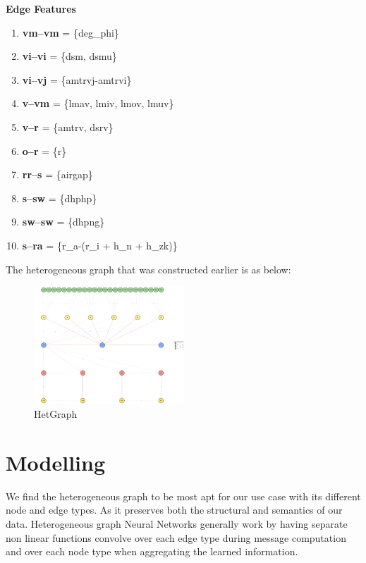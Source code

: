 \documentclass[a4paper,12pt]{article}
\begin{document}
\textbf{Edge Features}

\begin{enumerate}

    \item \textbf{vm--vm} = \{deg\_phi\}

    \item \textbf{vi--vi} = \{dsm, dsmu\}

    \item \textbf{vi--vj} = \{amtrvj-amtrvi\}

    \item \textbf{v--vm} = \{lmav, lmiv, lmov, lmuv\}

    \item \textbf{v--r} = \{amtrv, dsrv\}
    
    \item \textbf{o--r} = \{r\}

    \item \textbf{rr--s} = \{airgap\}

    \item \textbf{s--sw} = \{dhphp\}
    
    \item \textbf{sw--sw} = \{dhpng\}
    
    \item \textbf{s--ra} = \{r\_a-(r\_i + h\_n + h\_zk)\}
    
\end{enumerate}
The heterogeneous graph that was constructed earlier is as below:
\begin{figure}[h]
    \centering
    \includegraphics[width=0.5\textwidth]{./ReportImages/graph.png} 
    \caption{HetGraph}
    \label{fig:Graph}
\end{figure}

\newpage 

\section*{Modelling}
We find the heterogeneous graph to be most apt for our use case with its different node and edge types. As it preserves both the structural and semantics of our data.
Heterogeneous graph Neural Networks generally work by having separate non linear functions convolve over each edge type during message computation and over each node type when aggregating the learned information.
\end{document}
